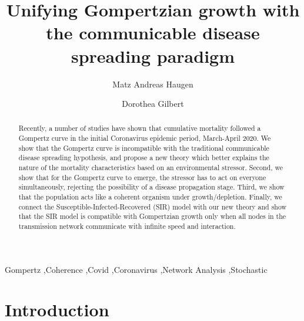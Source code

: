 \documentclass[review]{elsarticle}
\begin{document}
\begin{frontmatter}

\title{Unifying Gompertzian growth with the communicable disease spreading paradigm}


\author[mymainaddress]{Matz Andreas Haugen}

\author[mysecondaryaddress]{Dorothea Gilbert}

\address[mymainaddress]{Enerhauggata 1, 0651 Oslo, Norway}
\address[mysecondaryaddress]{University of Oslo, Oslo, Norway}

\begin{abstract}
Recently, a number of studies have shown that cumulative mortality followed a Gompertz curve in the initial Coronavirus epidemic period, March-April 2020. We show that the Gompertz curve is incompatible with the traditional communicable disease spreading hypothesis, and propose a new theory which better explains the nature of the mortality characteristics based on an environmental stressor. Second, we show that for the Gompertz curve to emerge, the stressor has to act on everyone simultaneously, rejecting the possibility of a disease propagation stage. Third, we show that the population acts like a coherent organism under growth/depletion. Finally, we connect the Susceptible-Infected-Recovered (SIR) model with our new theory and show that the SIR model is compatible with Gompertzian growth only when all nodes in the transmission network communicate with infinite speed and interaction.
\end{abstract}

\begin{keyword}
Gompertz \sep Coherence \sep Covid \sep Coronavirus \sep Network Analysis \sep Stochastic
\end{keyword}

\end{frontmatter}

\linenumbers

\section{Introduction}
\end{document}
